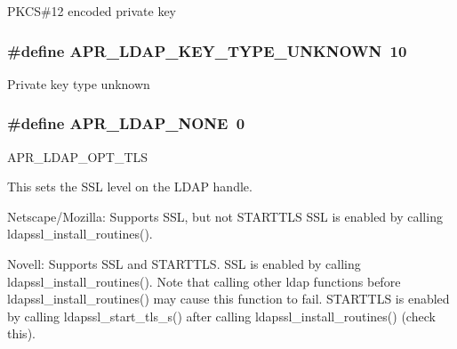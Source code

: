 P\-K\-C\-S\#12 encoded private key \hypertarget{group___a_p_r___util___l_d_a_p_ga4ec017388c41432a6a255ecb28e0ae2d}{
\subsubsection[{A\-P\-R\-\_\-\-L\-D\-A\-P\-\_\-\-K\-E\-Y\-\_\-\-T\-Y\-P\-E\-\_\-\-U\-N\-K\-N\-O\-W\-N}]{\setlength{\rightskip}{0pt plus 5cm}\#define A\-P\-R\-\_\-\-L\-D\-A\-P\-\_\-\-K\-E\-Y\-\_\-\-T\-Y\-P\-E\-\_\-\-U\-N\-K\-N\-O\-W\-N~10}}\label{group___a_p_r___util___l_d_a_p_ga4ec017388c41432a6a255ecb28e0ae2d}
Private key type unknown \hypertarget{group___a_p_r___util___l_d_a_p_ga005b3c879760af5d38f9dbd2e910c695}{
\subsubsection[{A\-P\-R\-\_\-\-L\-D\-A\-P\-\_\-\-N\-O\-N\-E}]{\setlength{\rightskip}{0pt plus 5cm}\#define A\-P\-R\-\_\-\-L\-D\-A\-P\-\_\-\-N\-O\-N\-E~0}}\label{group___a_p_r___util___l_d_a_p_ga005b3c879760af5d38f9dbd2e910c695}
A\-P\-R\-\_\-\-L\-D\-A\-P\-\_\-\-O\-P\-T\-\_\-\-T\-L\-S

This sets the S\-S\-L level on the L\-D\-A\-P handle.

Netscape/\-Mozilla\-: Supports S\-S\-L, but not S\-T\-A\-R\-T\-T\-L\-S S\-S\-L is enabled by calling ldapssl\-\_\-install\-\_\-routines().

Novell\-: Supports S\-S\-L and S\-T\-A\-R\-T\-T\-L\-S. S\-S\-L is enabled by calling ldapssl\-\_\-install\-\_\-routines(). Note that calling other ldap functions before ldapssl\-\_\-install\-\_\-routines() may cause this function to fail. S\-T\-A\-R\-T\-T\-L\-S is enabled by calling ldapssl\-\_\-start\-\_\-tls\-\_\-s() after calling ldapssl\-\_\-install\-\_\-routines() (check this).

